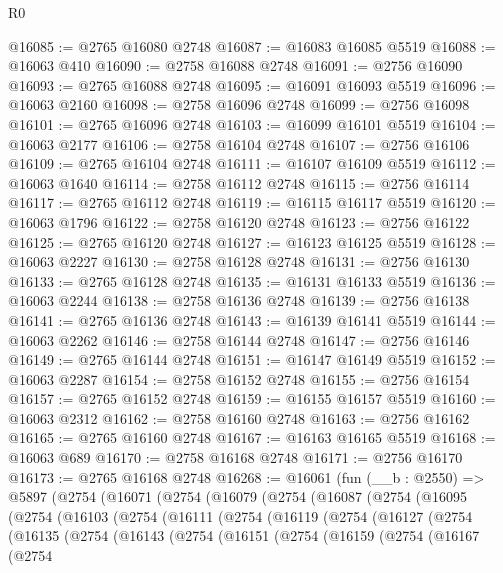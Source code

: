 \begin{lexlean}{R0}
\begin{coremodule}
@16085 := @2765 @16080 @2748
@16087 := @16083 @16085 @5519
@16088 := @16063 @410
@16090 := @2758 @16088 @2748
@16091 := @2756 @16090
@16093 := @2765 @16088 @2748
@16095 := @16091 @16093 @5519
@16096 := @16063 @2160
@16098 := @2758 @16096 @2748
@16099 := @2756 @16098
@16101 := @2765 @16096 @2748
@16103 := @16099 @16101 @5519
@16104 := @16063 @2177
@16106 := @2758 @16104 @2748
@16107 := @2756 @16106
@16109 := @2765 @16104 @2748
@16111 := @16107 @16109 @5519
@16112 := @16063 @1640
@16114 := @2758 @16112 @2748
@16115 := @2756 @16114
@16117 := @2765 @16112 @2748
@16119 := @16115 @16117 @5519
@16120 := @16063 @1796
@16122 := @2758 @16120 @2748
@16123 := @2756 @16122
@16125 := @2765 @16120 @2748
@16127 := @16123 @16125 @5519
@16128 := @16063 @2227
@16130 := @2758 @16128 @2748
@16131 := @2756 @16130
@16133 := @2765 @16128 @2748
@16135 := @16131 @16133 @5519
@16136 := @16063 @2244
@16138 := @2758 @16136 @2748
@16139 := @2756 @16138
@16141 := @2765 @16136 @2748
@16143 := @16139 @16141 @5519
@16144 := @16063 @2262
@16146 := @2758 @16144 @2748
@16147 := @2756 @16146
@16149 := @2765 @16144 @2748
@16151 := @16147 @16149 @5519
@16152 := @16063 @2287
@16154 := @2758 @16152 @2748
@16155 := @2756 @16154
@16157 := @2765 @16152 @2748
@16159 := @16155 @16157 @5519
@16160 := @16063 @2312
@16162 := @2758 @16160 @2748
@16163 := @2756 @16162
@16165 := @2765 @16160 @2748
@16167 := @16163 @16165 @5519
@16168 := @16063 @689
@16170 := @2758 @16168 @2748
@16171 := @2756 @16170
@16173 := @2765 @16168 @2748
@16268 := @16061
    (fun (__b : @2550) =>
    @5897
      (@2754
        (@16071
          (@2754
            (@16079
              (@2754
                (@16087
                  (@2754
                    (@16095
                      (@2754
                        (@16103
                          (@2754
                            (@16111
                              (@2754
                                (@16119
                                  (@2754
                                    (@16127
                                      (@2754
                                        (@16135
                                          (@2754
                                            (@16143
                                              (@2754
                                                (@16151
                                                  (@2754
                                                    (@16159
                                                      (@2754
                                                        (@16167
                                                          (@2754

\end{coremodule}
\end{lexlean}
